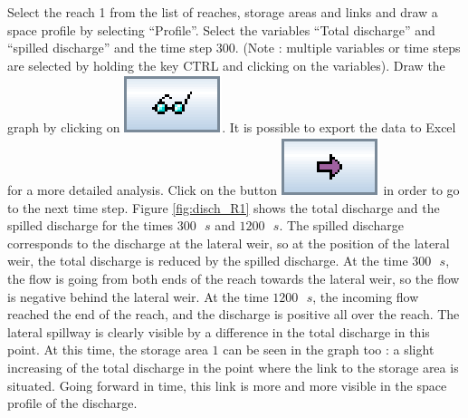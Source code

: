 \documentclass[a4paper,12pt]{article}
\begin{document}
\vspace{0.5cm}

Select the reach 1 from the list of reaches, storage areas and links
and draw a space profile by selecting {}``Profile''. Select the
variables {}``Total discharge'' and {}``spilled discharge'' and
the time step $300$. (Note : multiple variables or time steps are selected
by holding the key CTRL and clicking on the variables). Draw the graph
by clicking on \includegraphics[scale=0.6]{show}.
It is possible to export the data to Excel for a more detailed analysis.
Click on the button \includegraphics[scale=0.6]{avancer} in
order to go to the next time step. Figure \ref{fig:disch_R1}
shows the total discharge and the spilled discharge for the times
$300\mbox{ }s$ and $1200\mbox{ }s$. The spilled discharge corresponds to the discharge
at the lateral weir, so at the position of the lateral weir, the total
discharge is reduced by the spilled discharge. At the time $300\mbox{ }s$, the
flow is going from both ends of the reach towards the lateral weir,
so the flow is negative behind the lateral weir. At the time $1200\mbox{ }s$,
the incoming flow reached the end of the reach, and the discharge
is positive all over the reach. The lateral spillway is clearly visible
by a difference in the total discharge in this point. At this time,
the storage area $1$ can be seen in the graph too : a slight increasing
of the total discharge in the point where the link to the storage
area is situated. Going forward in time, this link is more and more
visible in the space profile of the discharge.

\newpage
\end{document}
